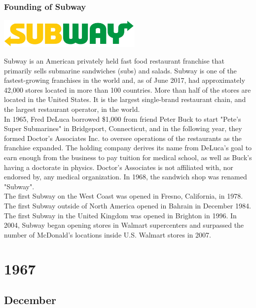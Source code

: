 \documentclass[11pt]{report}
\begin{document}
\subsection{Founding of Subway}
\vspace{2mm}\begin{center}\includegraphics[width=7cm]{./img/subwayLogo.jpg}\end{center}
Subway is an American privately held fast food restaurant franchise that primarily sells submarine sandwiches (subs) and salads. Subway is one of the fastest-growing franchises in the world and, as of June 2017, had approximately 42,000 stores located in more than 100 countries. More than half of the stores are located in the United States. It is the largest single-brand restaurant chain, and the largest restaurant operator, in the world.\\
\indent In 1965, Fred DeLuca borrowed \$1,000 from friend Peter Buck to start "Pete's Super Submarines" in Bridgeport, Connecticut, and in the following year, they formed Doctor's Associates Inc. to oversee operations of the restaurants as the franchise expanded. The holding company derives its name from DeLuca's goal to earn enough from the business to pay tuition for medical school, as well as Buck's having a doctorate in physics. Doctor's Associates is not affiliated with, nor endorsed by, any medical organization. In 1968, the sandwich shop was renamed "Subway".\\
\indent The first Subway on the West Coast was opened in Fresno, California, in 1978. The first Subway outside of North America opened in Bahrain in December 1984. The first Subway in the United Kingdom was opened in Brighton in 1996. In 2004, Subway began opening stores in Walmart supercenters and surpassed the number of McDonald's locations inside U.S. Walmart stores in 2007.

\chapter{1967}
\section{December}
\end{document}
